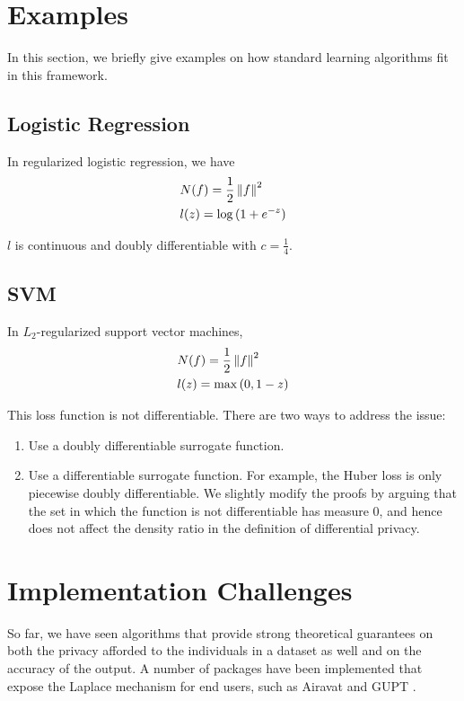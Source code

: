 \documentclass{article} %
\begin{document}
\section{Examples}
In this section, we briefly give examples on how standard learning algorithms fit in this framework.
	\subsection{Logistic Regression}
	In regularized logistic regression, we have
	\begin{align*}
	& N(f) = \frac{1}{2} \left\lVert f\right\rVert^2\\
	& l(z) = \log{(1 + e^{-z})}
	\end{align*}

	$l$ is continuous and doubly differentiable with $c = \frac{1}{4}$.
	\subsection{SVM}
	In $L_2$-regularized support vector machines,
	\begin{align*}
	& N(f) = \frac{1}{2} \left\lVert f\right\rVert^2\\
	& l(z) = \max{(0, 1 - z)}
	\end{align*}

	This loss function is not differentiable. There are two ways to address the issue:
	\begin{enumerate}[label=(\roman*)]
		\item Use a doubly differentiable surrogate function.
		\item Use a differentiable surrogate function.
		For example, the Huber loss is only piecewise doubly differentiable. We slightly modify the proofs by arguing that the set in which the function is not differentiable has measure $0$, and hence does not affect the density ratio in the definition of differential privacy.
	\end{enumerate}

\section{Implementation Challenges}
So far, we have seen algorithms that provide strong theoretical guarantees on
both the privacy afforded to the individuals in a dataset as well and on the
accuracy of the output. A number of packages have been implemented that expose
the Laplace mechanism for end users, such as Airavat
\cite{mohan2012gupt} and GUPT \cite{roy2010airavat}.
\end{document}
